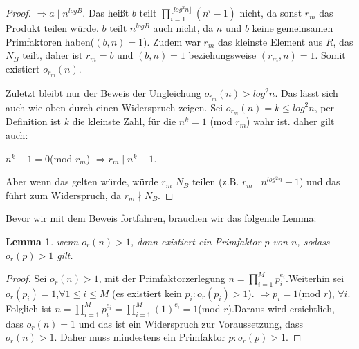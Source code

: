 \documentclass[12pt,oneside]{article}
\newtheorem{lemma}[theorem]{Lemma}
\theoremstyle{remark}
\theoremstyle{definition}
\begin{document}
\begin{proof}
$\Rightarrow a \mid n^{log B}$.\newline
Das heißt $b$ teilt $\prod_{i = 1}^{\lfloor log^2 n \rfloor}(n^i - 1)$ nicht, da sonst $r_{m}$ das Produkt teilen würde. $b$ teilt $n^{log B}$ auch nicht, da $n$ und $b$ keine gemeinsamen Primfaktoren haben($(b,n) = 1$). Zudem war $r_{m}$ das kleinste Element aus $R$, das $N_{B}$ teilt, daher ist $r_{m}= b$ und $(b,n) = 1$ beziehungsweise $(r_{m},n) = 1$. Somit existiert $o_{r_{m}}(n)$.\newline\newline

Zuletzt bleibt nur der Beweis der Ungleichung $o_{r_{m}}(n) > log^2 n$. Das lässt sich auch wie oben durch einen Widerspruch zeigen. Sei $o_{r_{m}}(n) = k \leq log^2 n$, per Definition ist $k$ die kleinste Zahl, für die $n^k = 1$ (mod $r_{m}$) wahr ist. daher gilt auch:\newline\newline
\centerline{$n^k - 1 = 0 $(mod  $r_{m}$) $\Rightarrow r_{m} \mid n^k - 1$.}

Aber wenn das gelten würde, würde $r_{m}$ $N_{B}$ teilen (z.B. $ r_{m} \mid n^{log^2 n} -1$) und das führt zum Widerspruch, da $r_{m} \nmid N_{B}$. 
\end{proof}

Bevor wir mit dem Beweis fortfahren, brauchen wir das folgende Lemma:

\begin{lemma}\label{ord_prime_l}
wenn $o_{r}(n) > 1$, dann existiert ein Primfaktor $p$ von $n$, sodass $o_{r}(p) > 1$ gilt. 
\end{lemma}
\begin{proof}
Sei $o_{r}(n) > 1$, mit der Primfaktorzerlegung $n = \prod_{i = 1}^{M} p_{i}^{e_{i}}$.\newline\newline Weiterhin sei $o_{r}(p_{i}) = 1$,$\forall 1 \leq i \leq M$ (es existiert kein $p_{i} : o_{r}(p_{i}) > 1$).\newline\newline
$\Rightarrow p_{i} = 1 $(mod $r$), $\forall i$. Folglich ist $n = \prod_{i = 1} ^{M} p_{i}^{e_{i}} = \prod_{i = 1} ^{M}(1)^{e_{i}} = 1 $(mod $r$).\newline\newline Daraus wird ersichtlich, dass $o_{r}(n) = 1$ und das ist ein Widerspruch zur Voraussetzung, dass $o_{r}(n) > 1$. Daher muss mindestens ein Primfaktor $p : o_{r}(p) > 1$.  
\end{proof}
\end{document}
